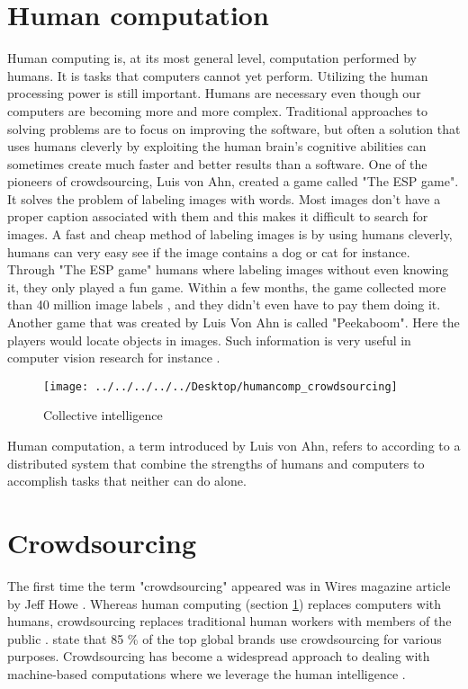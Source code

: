 \section{Human computation}\label{sec:humancomputation}
Human computing is, at its most general level, computation performed by humans. It is tasks that computers cannot yet perform. 
Utilizing the human processing power is still important. Humans are necessary even though our computers are becoming more and more complex. Traditional approaches to solving problems are to focus on improving the software, but often a solution that uses humans cleverly by exploiting the human brain's cognitive abilities can sometimes create much faster and better results than a software. One of the pioneers of crowdsourcing, Luis von Ahn, created a game called "The ESP game". It solves the problem of labeling images with words. Most images don't have a proper caption associated with them and this makes it difficult to search for images. A fast and cheap method of labeling images is by using humans cleverly, humans can very easy see if the image contains a dog or cat for instance. Through "The ESP game" humans where labeling images without even knowing it, they only played a fun game. Within a few months, the game collected more than 40 million image labels \citep{VonAhn2008}, and they didn't even have to pay them doing it. Another game that was created by Luis Von Ahn is called "Peekaboom". Here the players would locate objects in images. Such information is very useful in computer vision research for instance \citep{VonAhn2008}.   

\begin{figure}[H]
	\centering
	\texttt{[image: ../../../../../Desktop/humancomp\_crowdsourcing]}
	\caption{Collective intelligence \citep{Quinn2011}}
	\label{fig:humancompcrowdsourcing}
\end{figure}

Human computation, a term introduced by Luis von Ahn, refers to according to \cite{Quinn2011} a distributed system that combine the strengths of humans and computers to accomplish tasks that neither can do alone. 

\section{Crowdsourcing}\label{sec:crowdsourcing}

The first time the term "crowdsourcing" appeared was in Wires magazine article by Jeff Howe \citep{Howe2006}. Whereas human computing (section \ref{sec:humancomputation}) replaces computers with humans, crowdsourcing replaces traditional human workers with members of the public \citep{Quinn2011}. \cite{EYeka2015} state that 85 \% of the top global brands use crowdsourcing for various purposes. Crowdsourcing has become a widespread approach to dealing with machine-based computations where we leverage the human intelligence \citep{Gadiraju2015}.

